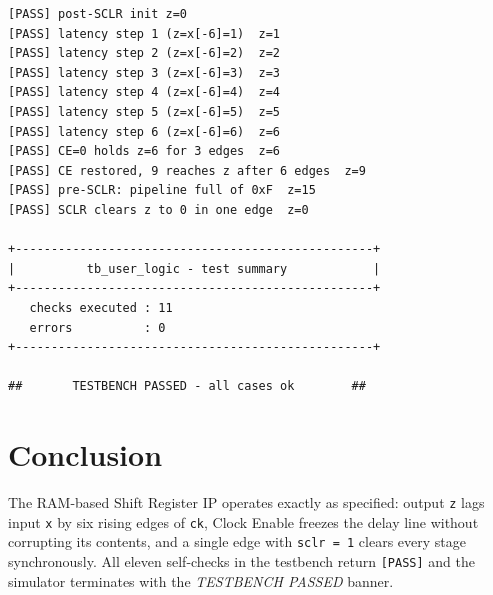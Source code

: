 \documentclass[11pt,letterpaper]{article}
\begin{document}
\begin{lstlisting}[language={},basicstyle=\ttfamily\small,
                    numbers=none,backgroundcolor=\color{codebg},
                    frame=single,breaklines=true,
                    xleftmargin=8pt,xrightmargin=2pt]
[PASS] post-SCLR init z=0
[PASS] latency step 1 (z=x[-6]=1)  z=1
[PASS] latency step 2 (z=x[-6]=2)  z=2
[PASS] latency step 3 (z=x[-6]=3)  z=3
[PASS] latency step 4 (z=x[-6]=4)  z=4
[PASS] latency step 5 (z=x[-6]=5)  z=5
[PASS] latency step 6 (z=x[-6]=6)  z=6
[PASS] CE=0 holds z=6 for 3 edges  z=6
[PASS] CE restored, 9 reaches z after 6 edges  z=9
[PASS] pre-SCLR: pipeline full of 0xF  z=15
[PASS] SCLR clears z to 0 in one edge  z=0

+--------------------------------------------------+
|          tb_user_logic - test summary            |
+--------------------------------------------------+
   checks executed : 11
   errors          : 0
+--------------------------------------------------+

##       TESTBENCH PASSED - all cases ok        ##
\end{lstlisting}

\section{Conclusion}

The RAM-based Shift Register IP operates exactly as specified:
output \texttt{z} lags input \texttt{x} by six rising edges of \texttt{ck},
Clock Enable freezes the delay line without corrupting its contents, and
a single edge with \texttt{sclr = 1} clears every stage synchronously.
All eleven self-checks in the testbench return \texttt{[PASS]} and the
simulator terminates with the \textit{TESTBENCH PASSED} banner.
\end{document}
